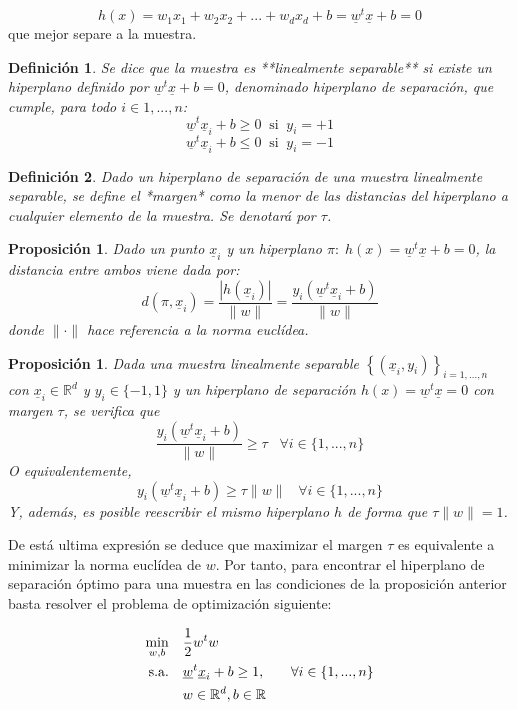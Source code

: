 \documentclass[12pt,a4paper,]{book}
\newcounter{dummy}
\numberwithin{dummy}{section}
\theoremstyle{ocrenumbox}
\theoremstyle{blacknumex}
\theoremstyle{blacknumbox}
\newtheorem{definitionT}{Definición}[section]  %
\theoremstyle{ocrenum}
\newtheorem{proposition}[dummy]{Proposición} %
\newenvironment{definition}{\begin{dBox}\begin{definitionT}}{\end{definitionT}\end{dBox}}
\theoremstyle{ocrenum}
\begin{document}
\[h(x) = w_1x_1 +w_2x_2+...+w_dx_d +b = \underline w^t \underline x + b= 0 \]
que mejor separe a la muestra.

\begin{definition}
Se dice que la muestra es **linealmente separable** si existe un hiperplano definido por $\underline w^t \underline x + b= 0$, denominado hiperplano de separación, que cumple, para todo $i \in 1,...,n$:
$$\underline w^t \underline x_i + b \ge 0 \; \; \text{si} \;\; y_i=+1$$
$$\underline w^t \underline x_i + b \le 0 \; \; \text{si} \;\; y_i=-1$$
\end{definition}

\begin{definition}
Dado un hiperplano de separación de una muestra linealmente separable, se define el *margen* como la menor de las distancias del hiperplano a cualquier elemento de la muestra. Se denotará por $\tau$.
\end{definition}

\begin{proposition}
Dado un punto $\underline x_i$ y un hiperplano $\pi :\;h(x) = \underline w^t \underline x + b= 0$, la distancia entre ambos viene dada por:
$$d(\pi,\underline x_i) = \frac{|h(\underline x_i)|}{\|w\|} = \frac{y_i(\underline w^t \underline x_i+b)}{\|w\|}$$
donde $\|\cdot\|$ hace referencia a la norma euclídea.
\end{proposition}

\begin{proposition}
Dada una muestra linealmente separable $\left\{(\underline x_i,y_i) \right\}_{i=1,...,n}$ con $\underline x_i \in \mathbb{R}^d$ y $y_i \in \{-1,1\}$ y un hiperplano de separación $h(x) = \underline w^t \underline x = 0$ con margen $\tau$, se verifica que
$$\frac{y_i(\underline w^t \underline x_i+b)}{\|w\|} \ge \tau \;\;\; \forall i\in \{1,...,n\}$$
O equivalentemente,
$$y_i(\underline w^t \underline x_i+b) \ge \tau\|w\| \;\;\; \forall i\in \{1,...,n\}$$
Y, además, es posible reescribir el mismo hiperplano $h$ de forma que $\tau\|w\| = 1$.
\end{proposition}

De está ultima expresión se deduce que maximizar el margen \(\tau\) es
equivalente a minimizar la norma euclídea de \(w\). Por tanto, para
encontrar el hiperplano de separación óptimo para una muestra en las
condiciones de la proposición anterior basta resolver el problema de
optimización siguiente:

\begin{equation}
\begin{aligned}
\min_{w,b} \quad & \frac{1}{2}w^{t}w\\
\textrm{s.a.} \quad & \underline w^t \underline x_i+b \ge 1, \quad & \forall i\in \{1,...,n\} \\
  & w \in \mathbb{R}^d, \space b \in \mathbb{R} \\ 
\end{aligned}
\end{equation}
\end{document}
